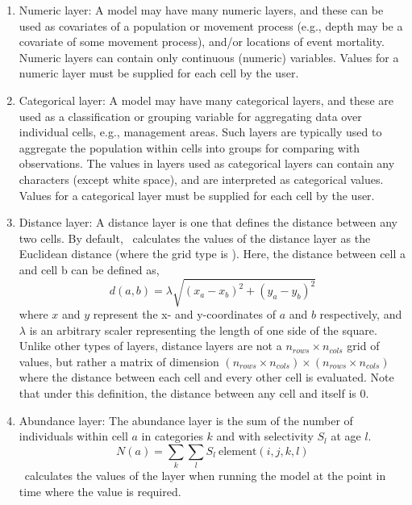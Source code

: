 \begin{enumerate}
\item{Numeric layer\label{numeric-layer}}: A model may have many numeric layers, and these can be used as covariates of a population or movement process (e.g., depth may be a covariate of some movement process), and/or locations of event mortality. Numeric layers can contain only continuous (numeric) variables. Values for a numeric layer must be supplied for each cell by the user.

\item {Categorical layer\label{categorical-layer}}: A model may have many categorical layers, and these are used as a classification or grouping variable for aggregating data over individual cells, e.g., management areas. Such layers are typically used to aggregate the population within cells into groups for comparing with observations. The values in layers used as categorical layers can contain any characters (except white space), and are interpreted as categorical values. Values for a categorical layer must be supplied for each cell by the user.

\item {Distance layer}: A distance layer is one that defines the distance between any two cells. By default, \SPM\ calculates the values of the distance layer as the Euclidean distance (where the grid type is ). Here, the distance between cell a and cell b can be defined as,
\begin{equation}
  d(a,b) = \lambda \sqrt{(x_a - x_b)^2 + (y_a - y_b)^2}
\end{equation}
where $x$ and $y$ represent the x- and y-coordinates of $a$ and $b$ respectively, and $\lambda$ is an arbitrary scaler representing the length of one side of the square. Unlike other types of layers, distance layers are not a $n_{rows} \times n_{cols}$ grid of values, but rather a matrix of dimension $(n_{rows} \times n_{cols}) \times (n_{rows} \times n_{cols})$  where the distance between each cell and every other cell is evaluated. Note that under this definition, the distance between any cell and itself is 0. 

\item{Abundance layer}: The abundance layer is the sum of the number of individuals within cell $a$ in categories $k$ and with selectivity $S_l$ at age $l$. 
\begin{equation}
  N(a) = \sum\limits_{k} \sum\limits_l S_l \ \text{element}(i,j,k,l)
\end{equation}
\SPM\ calculates the values of the layer when running the model at the point in time where the value is required.


\end{enumerate}
